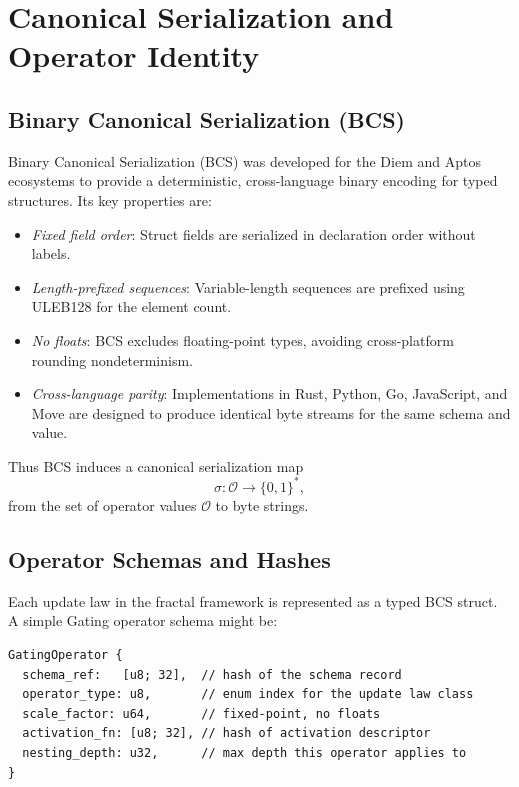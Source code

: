 \documentclass[11pt]{article}
\begin{document}
\section{Canonical Serialization and Operator Identity}

\subsection{Binary Canonical Serialization (BCS)}

Binary Canonical Serialization (BCS) was developed for the Diem and Aptos ecosystems to provide a deterministic, cross-language binary encoding for typed structures. Its key properties are:

\begin{itemize}[leftmargin=*]
  \item \emph{Fixed field order}: Struct fields are serialized in declaration order without labels.
  \item \emph{Length-prefixed sequences}: Variable-length sequences are prefixed using ULEB128 for the element count.
  \item \emph{No floats}: BCS excludes floating-point types, avoiding cross-platform rounding nondeterminism.
  \item \emph{Cross-language parity}: Implementations in Rust, Python, Go, JavaScript, and Move are designed to produce identical byte streams for the same schema and value.
\end{itemize}

Thus BCS induces a canonical serialization map
\[
  \sigma : \mathcal{O} \to \{0,1\}^*,
\]
from the set of operator values \( \mathcal{O} \) to byte strings.

\subsection{Operator Schemas and Hashes}

Each update law in the fractal framework is represented as a typed BCS struct. A simple Gating operator schema might be:

\begin{verbatim}
GatingOperator {
  schema_ref:   [u8; 32],  // hash of the schema record
  operator_type: u8,       // enum index for the update law class
  scale_factor: u64,       // fixed-point, no floats
  activation_fn: [u8; 32], // hash of activation descriptor
  nesting_depth: u32,      // max depth this operator applies to
}
\end{verbatim}
\end{document}
